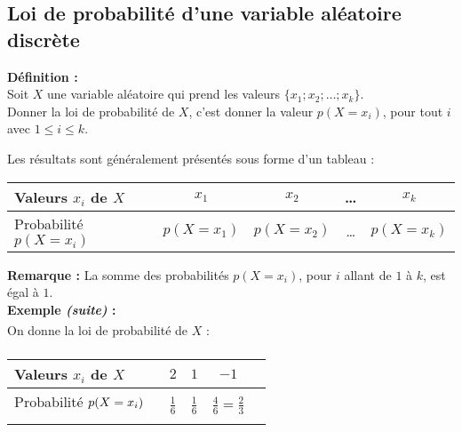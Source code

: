 \documentclass[11pt,a4paper]{article}
\begin{document}
\subsection*{Loi de probabilité d'une variable aléatoire discrète}

\begin{mdframed}[style=definitionStyle]
    \textbf{Définition :} ~\\
    Soit $X$ une variable aléatoire qui prend les valeurs $\{x_1;x_2;\dots;x_k\}$. \\
    Donner la loi de probabilité de $X$, c'est donner la valeur $p(X=x_i)$, pour tout $i$ avec $1\leq i\leq k$.
    \vspace*{4pt}

    Les résultats sont généralement présentés sous forme d'un tableau : \\
    \vspace*{-8pt}

    \renewcommand{\arraystretch}{1.6}
    \begin{tabular}{|l|c|c|c|c|}
        \hline
        Valeurs $x_i$ de $X$ & $x_1$      & $x_2$      & \quad\text{ }\dots\quad\text{ } & $x_k$      \\
        \hline
        Probabilité $p(X=x_i)$     & $p(X=x_1)$ & $p(X=x_2)$ & \quad\text{ }\dots\quad\text{ } & $p(X=x_k)$ \\
        \hline
    \end{tabular}
\end{mdframed}

\textbf{Remarque :} La somme des probabilités $p(X=x_i)$, pour $i$ allant de $1$ à $k$, est égal à $1$. \\

\textbf{Exemple \emph{(suite)} :} ~\\

On donne la loi de probabilité de $X$ : $\displaystyle{\color{white}\frac{1}{1}}$\\
\renewcommand{\arraystretch}{2}
\begin{tabular}{|l|c|c|c|c|}
    \hline
    Valeurs $x_i$ de $X$      & $2$                        & $1$                        & $-1$                                   \\
    \hline
    Probabilité  $p(X=x_i)\displaystyle{\color{white}\frac{1}{\frac{1}{1}}}$ & $\displaystyle\frac{1}{6}$ & $\displaystyle\frac{1}{6}$ & $\displaystyle\frac{4}{6}=\frac{2}{3}$ \\
    \hline
\end{tabular}
\end{document}
